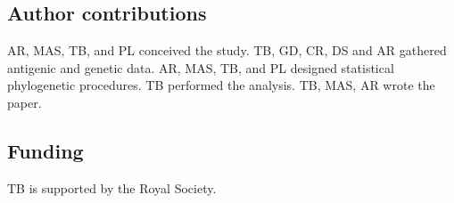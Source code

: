 \documentclass[11pt,oneside,letterpaper]{article}
\begin{document}
\subsection*{Author contributions} 

AR, MAS, TB, and PL conceived the study.
TB, GD, CR, DS and AR gathered antigenic and genetic data.
AR, MAS, TB, and PL designed statistical phylogenetic procedures.
TB performed the analysis.
TB, MAS, AR wrote the paper.

\subsection*{Funding} 

TB is supported by the Royal Society.






\end{document}
